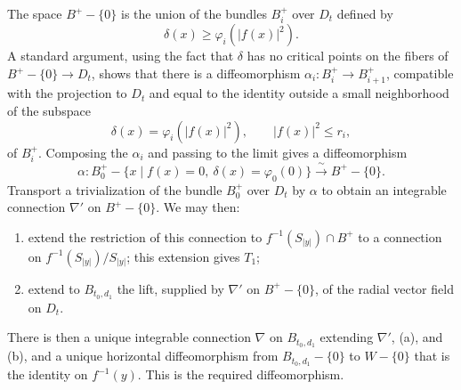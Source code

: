 The space $B^+-\{0\}$ is the union of the bundles $B_i^+$ over
$D_t$ defined by
\[
\delta(x)\geq\varphi_i(|f(x)|^2).
\]
A standard argument, using the fact that $\delta$ has no critical
points on the fibers of $B^+-\{0\}\to D_t$, shows that there is a
diffeomorphism $\alpha_i:B_i^+\to B_{i+1}^+$, compatible with the
projection to $D_t$ and equal to the identity outside a small
neighborhood of the subspace
\[
\delta(x)=\varphi_i(|f(x)|^2),
\qquad |f(x)|^2\leq r_i,
\]
of $B_i^+$.  Composing the $\alpha_i$ and passing to the limit gives
a diffeomorphism
\[
\alpha:B_0^+-\{x\mid f(x)=0,\ \delta(x)=\varphi_0(0)\}
\xrightarrow{\ \sim\ }B^+-\{0\}.
\]
Transport a trivialization of the bundle $B_0^+$ over $D_t$ by
$\alpha$ to obtain an integrable connection $\nabla'$ on
$B^+-\{0\}$.  We may then:

\begin{enumerate}[label=(\alph*)]
\item extend the restriction of this connection to
  $f^{-1}(S_{|y|})\cap B^+$ to a connection on
  $f^{-1}(S_{|y|})/S_{|y|}$; this extension gives $T_1$;
\item extend to $B_{t_0,d_1}$ the lift, supplied by $\nabla'$ on
  $B^+-\{0\}$, of the radial vector field on $D_t$.
\end{enumerate}

There is then a unique integrable connection $\nabla$ on
$B_{t_0,d_1}$ extending $\nabla'$, (a), and (b), and a unique
horizontal diffeomorphism from $B_{t_0,d_1}-\{0\}$ to $W-\{0\}$
that is the identity on $f^{-1}(y)$.  This is the required
diffeomorphism.

